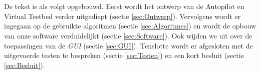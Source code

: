 \\
\\
De tekst is als volgt opgebouwd. Eerst wordt het ontwerp van de Autopilot en Virtual Testbed verder uitgediept (sectie \ref{sec:Ontwerp}). Vervolgens wordt er ingegaan op de gebruikte algoritmen (sectie \ref{sec:Algoritmes}) en wordt de opbouw van onze software verduidelijkt (sectie \ref{sec:Software}). Ook wijden we uit over de toepassingen van de \textit{GUI} (sectie \ref{sec:GUI}). Tenslotte wordt er afgesloten met de uitgevoerde testen te bespreken (sectie \ref{sec:Testen}) en een kort besluit (sectie \ref{sec:Besluit}). \\